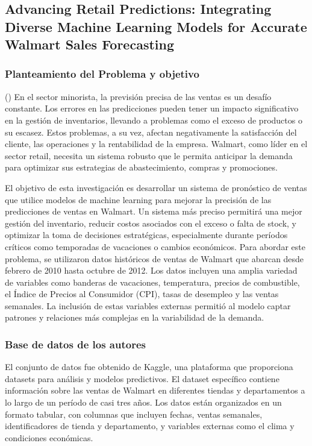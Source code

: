 \subsection{Advancing Retail Predictions: Integrating Diverse Machine Learning Models for Accurate Walmart Sales Forecasting \citep{wen2026clinical}}

\subsubsection{Planteamiento del Problema y objetivo}
(\cite{nebacyril2024}) En el sector minorista, la previsión precisa de las ventas es un desafío constante. Los errores en las predicciones pueden tener un impacto significativo en la gestión de inventarios, llevando a problemas como el exceso de productos o su escasez. Estos problemas, a su vez, afectan negativamente la satisfacción del cliente, las operaciones y la rentabilidad de la empresa. Walmart, como líder en el sector retail, necesita un sistema robusto que le permita anticipar la demanda para optimizar sus estrategias de abastecimiento, compras y promociones.

El objetivo de esta investigación es desarrollar un sistema de pronóstico de ventas que utilice modelos de machine learning para mejorar la precisión de las predicciones de ventas en Walmart. Un sistema más preciso permitirá una mejor gestión del inventario, reducir costos asociados con el exceso o falta de stock, y optimizar la toma de decisiones estratégicas, especialmente durante períodos críticos como temporadas de vacaciones o cambios económicos.
Para abordar este problema, se utilizaron datos históricos de ventas de Walmart que abarcan desde febrero de 2010 hasta octubre de 2012. Los datos incluyen una amplia variedad de variables como banderas de vacaciones, temperatura, precios de combustible, el Índice de Precios al Consumidor (CPI), tasas de desempleo y las ventas semanales. La inclusión de estas variables externas permitió al modelo captar patrones y relaciones más complejas en la variabilidad de la demanda.

\subsubsection{Base de datos de los autores}
El conjunto de datos fue obtenido de Kaggle, una plataforma que proporciona datasets para análisis y modelos predictivos. El dataset específico contiene información sobre las ventas de Walmart en diferentes tiendas y departamentos a lo largo de un período de casi tres años. Los datos están organizados en un formato tabular, con columnas que incluyen fechas, ventas semanales, identificadores de tienda y departamento, y variables externas como el clima y condiciones económicas.


